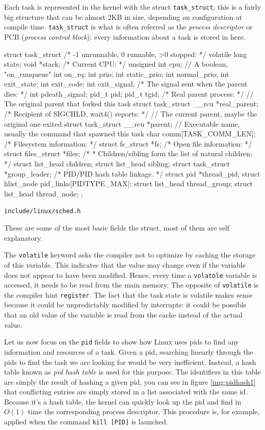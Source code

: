 \documentclass[10pt]{book}
\begin{document}
Each task is represented in the kernel with the struct \verb|task_struct|, this is a fairly big structure that can be almost 2KB in size, depending on configuration at compile time. \verb|task_struct| is what is often referred as the \textit{process descriptor} or PCB (\textit{process control block}): every information about a task is stored in here. 
\begin{code}
struct task_struct {
	/* -1 unrunnable, 0 runnable, >0 stopped: */
	volatile long			state;
	void				*stack;
	/* Current CPU: */
	unsigned int			cpu;
	// A boolean, "on_runqueue"
	int				on_rq; 
	int				prio;
	int				static_prio;
	int				normal_prio;
        int				exit_state;
	int				exit_code;
	int				exit_signal;
	/* The signal sent when the parent dies: */
	int				pdeath_signal;
	pid_t				pid;
	pid_t				tgid;
        /* Real parent process: */
        // The original parent that forked this task
	struct task_struct __rcu	*real_parent;
	/* Recipient of SIGCHLD, wait4() reports: */
	// The current parent, maybe the original one exited
	struct task_struct __rcu	*parent;
	// Executable name, usually the command that spawned this task
	char				comm[TASK_COMM_LEN]; 
        /* Filesystem information: */
	struct fs_struct		   *fs;
	/* Open file information: */
	struct files_struct		*files;
	/*
	 * Children/sibling form the list of natural children:
	 */
	struct list_head		children;
	struct list_head		sibling;
	struct task_struct	   *group_leader;
	/* PID/PID hash table linkage. */
	struct pid			*thread_pid;
	struct hlist_node	   pid_links[PIDTYPE_MAX];
	struct list_head		thread_group;
	struct list_head		thread_node;
};
\end{code}
\verb|include/linux/sched.h|

These are some of the most basic fields the struct, most of them are self explanatory.

The \verb|volatile| keyword asks the compiler not to optimize by
caching the storage of this variable. This indicates that the value
may change even if the variable does not appear to have been
modified. Hence, every time a \texttt{volatole} variable is accessed,
it needs to be read from the main memory. The opposite of
\verb|volatile| is the compiler hint \verb|register|. The fact that
the task state is volatile makes sense because it could be
unpredictably modified by interrupts: it could be possible that an old
value of the variable is read from the cache instead of the actual
value.

Let us now focus on the \texttt{pid} fields to show how Linux uses
pids to find any information and resources of a task. Given a pid,
searching linearly through the pids to find the task we are looking
for would be very inefficient. Instead, a hash table known as
\textit{pid hash table} is used for this purpose. The identifiers in
this table are simply the result of hashing a given pid, you can see
in figure \ref{img:pidhash1} that conflicting entries are simply
stored in a list associated with the same id. Because it's a hash
table, the kernel can quickly look up the pid and find in $O(1)$ time
the corresponding process descriptor. This procedure is, for example,
applied when the command \verb|kill [PID]| is launched.
\end{document}
